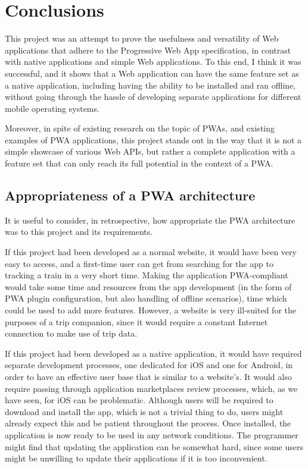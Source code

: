 \chapter{Conclusions}

This project was an attempt to prove the usefulness and versatility of Web applications that adhere to the Progressive Web App specification, in contrast with native applications and simple Web applications. To this end, I think it was successful, and it shows that a Web application can have the same feature set as a native application, including having the ability to be installed and ran offline, without going through the hassle of developing separate applications for different mobile operating systems.

Moreover, in spite of existing research on the topic of PWAs, and existing examples of PWA applications, this project stands out in the way that it is not a simple showcase of various Web APIs, but rather a complete application with a feature set that can only reach its full potential in the context of a PWA.

\section{Appropriateness of a PWA architecture}
It is useful to consider, in retrospective, how appropriate the PWA architecture was to this project and its requirements.

If this project had been developed as a normal website, it would have been very easy to access, and a first-time user can get from searching for the app to tracking a train in a very short time. Making the application PWA-compliant would take some time and resources from the app development (in the form of PWA plugin configuration, but also handling of offline scenarios), time which could be used to add more features. However, a website is very ill-suited for the purposes of a trip companion, since it would require a constant Internet connection to make use of trip data.

If this project had been developed as a native application, it would have required separate development processes, one dedicated for iOS and one for Android, in order to have an effective user base that is similar to a website's. It would also require passing through application marketplaces review processes, which, as we have seen, for iOS can be problematic. Although users will be required to download and install the app, which is not a trivial thing to do, users might already expect this and be patient throughout the process. Once installed, the application is now ready to be used in any network conditions. The programmer might find that updating the application can be somewhat hard, since some users might be unwilling to update their applications if it is too inconvenient.

